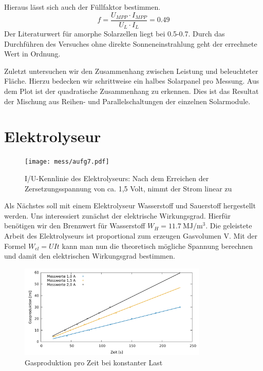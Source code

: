 Hieraus lässt sich auch der Füllfaktor bestimmen.
\[
	f= \frac{U_{MPP} \cdot I_{MPP}}{U_L \cdot I_L} = 0.49
\]
Der Literaturwert für amorphe Solarzellen liegt bei 0.5-0.7. Durch das Durchführen des Versuches ohne direkte Sonneneinstrahlung geht der errechnete Wert in Ordnung.

Zuletzt untersuchen wir den Zusammenhang zwischen Leistung und beleuchteter Fläche. Hierzu bedecken wir schrittweise ein halbes Solarpanel pro Messung. Aus dem Plot  ist der quadratische Zusammenhang zu erkennen. Dies ist das Resultat der Mischung aus Reihen- und Parallelschaltungen der einzelnen Solarmodule. 

\section{Elektrolyseur}

\begin{figure}[htbp]
	\centering
	\texttt{[image: mess/aufg7.pdf]}
	\caption{I/U-Kennlinie des Elektrolyseurs: Nach dem Erreichen der Zersetzungsspannung von ca. 1,5 Volt, nimmt der Strom linear zu}
	\label{a7}
\end{figure}

Als Nächstes soll mit einem Elektrolyseur Wasserstoff und Sauerstoff hergestellt werden. 
Uns interessiert zunächst der elektrische Wirkungsgrad. Hierfür benötigen wir den Brennwert für Wasserstoff $W_H = \SI{11,7}{\mega \joule \per \metre \cubed}$. 
Die geleistete Arbeit des Elektrolyseurs ist proportional zum erzeugen Gasvolumen V. Mit der Formel $W_{el}=UIt$ kann man nun die theoretisch mögliche Spannung berechnen und damit den elektrischen Wirkungsgrad bestimmen.
\begin{figure}[htbp]
	\centering
	\includegraphics[width=0.8\textwidth]{mess/aufg8.pdf}
	\caption{Gasproduktion pro Zeit bei konstanter Last}
	\label{a8}
\end{figure}

